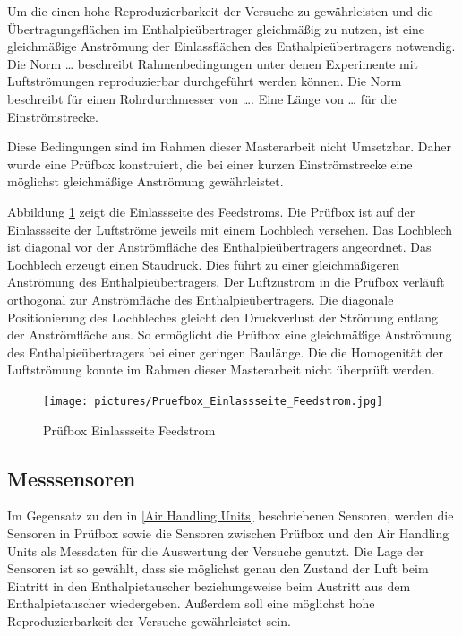 Um die einen hohe Reproduzierbarkeit der Versuche zu gewährleisten und die Übertragungsflächen im Enthalpieübertrager gleichmäßig zu nutzen, ist eine gleichmäßige Anströmung der Einlassflächen des Enthalpieübertragers notwendig. Die Norm … beschreibt Rahmenbedingungen unter denen Experimente mit Luftströmungen reproduzierbar durchgeführt werden können. Die Norm beschreibt für einen Rohrdurchmesser von  …. Eine Länge von … für die Einströmstrecke. 

Diese Bedingungen sind im Rahmen dieser Masterarbeit nicht Umsetzbar. Daher wurde eine Prüfbox konstruiert, die bei einer kurzen Einströmstrecke eine möglichst gleichmäßige Anströmung gewährleistet.

Abbildung \ref{fig:Prüfbox Einlassseite Feedstrom} zeigt die Einlassseite des Feedstroms. Die Prüfbox ist auf der Einlassseite der Luftströme jeweils mit einem Lochblech versehen. Das Lochblech ist diagonal vor der Anströmfläche des Enthalpieübertragers angeordnet. Das Lochblech erzeugt einen Staudruck. Dies führt zu einer gleichmäßigeren Anströmung des Enthalpieübertragers. Der Luftzustrom in die Prüfbox verläuft orthogonal zur Anströmfläche des Enthalpieübertragers. Die diagonale Positionierung des Lochbleches gleicht den Druckverlust der Strömung entlang der Anströmfläche aus. So ermöglicht die Prüfbox eine gleichmäßige Anströmung des Enthalpieübertragers bei einer geringen Baulänge. Die die Homogenität der Luftströmung konnte im Rahmen dieser Masterarbeit nicht überprüft werden.

\begin{figure} [h]
	\centering
	\texttt{[image: pictures/Pruefbox\_Einlassseite\_Feedstrom.jpg]}
	\caption{Prüfbox Einlassseite Feedstrom}
	\label{fig:Prüfbox Einlassseite Feedstrom}
\end{figure}


\subsection{Messsensoren}
\label{Messsensoren}

Im Gegensatz zu den in \ref{Air Handling Units} beschriebenen Sensoren, werden die Sensoren in Prüfbox sowie die Sensoren zwischen Prüfbox und den Air Handling Units als Messdaten für die Auswertung der Versuche genutzt. Die Lage der Sensoren ist so gewählt, dass sie möglichst genau den Zustand der Luft beim Eintritt in den Enthalpietauscher beziehungsweise beim Austritt aus dem Enthalpietauscher wiedergeben. Außerdem soll eine möglichst hohe Reproduzierbarkeit der Versuche gewährleistet sein.

